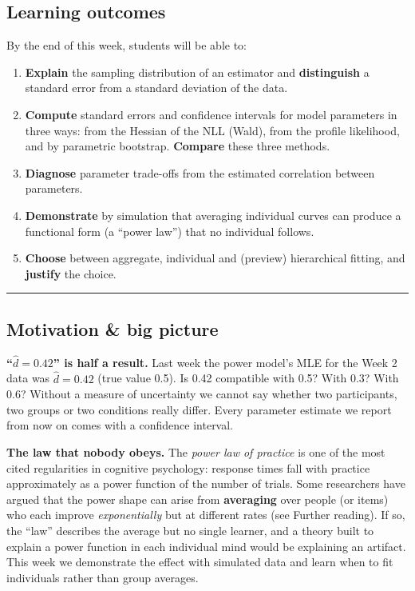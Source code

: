 \subsection{Learning outcomes}

By the end of this week, students will be able to:

\begin{enumerate}
\def\labelenumi{\arabic{enumi}.}
\tightlist
\item
  \textbf{Explain} the sampling distribution of an estimator and
  \textbf{distinguish} a standard error from a standard deviation of the
  data.
\item
  \textbf{Compute} standard errors and confidence intervals for model
  parameters in three ways: from the Hessian of the NLL (Wald), from the
  profile likelihood, and by parametric bootstrap. \textbf{Compare}
  these three methods.
\item
  \textbf{Diagnose} parameter trade-offs from the estimated correlation
  between parameters.
\item
  \textbf{Demonstrate} by simulation that averaging individual curves
  can produce a functional form (a ``power law'') that no individual
  follows.
\item
  \textbf{Choose} between aggregate, individual and (preview)
  hierarchical fitting, and \textbf{justify} the choice.
\end{enumerate}

\begin{center}\rule{0.5\linewidth}{0.5pt}\end{center}

\subsection{Motivation \& big picture}

\textbf{``\(\hat d = 0.42\)'' is half a result.} Last week the power
model's MLE for the Week 2 data was \(\hat d = 0.42\) (true value 0.5).
Is 0.42 compatible with 0.5? With 0.3? With 0.6? Without a measure of
uncertainty we cannot say whether two participants, two groups or two
conditions really differ. Every parameter estimate we report from now on
comes with a confidence interval.

\textbf{The law that nobody obeys.} The \emph{power law of practice} is
one of the most cited regularities in cognitive psychology: response
times fall with practice approximately as a power function of the number
of trials. Some researchers have argued that the power shape can arise
from \textbf{averaging} over people (or items) who each improve
\emph{exponentially} but at different rates (see Further reading). If
so, the ``law'' describes the average but no single learner, and a
theory built to explain a power function in each individual mind would
be explaining an artifact. This week we demonstrate the effect with
simulated data and learn when to fit individuals rather than group
averages.

